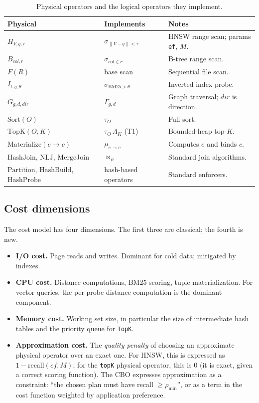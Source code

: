 \documentclass[sigconf,nonacm,review]{acmart}
\theoremstyle{plain}
\theoremstyle{definition}
\theoremstyle{remark}
\begin{document}
\begin{table}[t]
  \centering
  \scriptsize
  \begin{tabular}{@{}p{2.0cm}p{2.9cm}p{2.9cm}@{}}
    \toprule
    Physical & Implements & Notes \\
    \midrule
    $H_{V,q,\tau}$ & $\sigma_{\lVert V-q\rVert<\tau}$ & HNSW range scan; params \texttt{ef}, $M$. \\
    $B_{col,r}$ & $\sigma_{col \in r}$ & B-tree range scan. \\
    $F(R)$ & base scan & Sequential file scan. \\
    $I_{t,q,\theta}$ & $\sigma_{\mathrm{BM25}>\theta}$ & Inverted index probe. \\
    $G_{g,d,\mathit{dir}}$ & $\Gamma_{g,d}$ & Graph traversal; $\mathit{dir}$ is direction. \\
    $\mathrm{Sort}(O)$ & $\tau_O$ & Full sort. \\
    $\mathrm{TopK}(O,K)$ & $\tau_O\, \Lambda_K$ (T1) & Bounded-heap top-$K$. \\
    $\mathrm{Materialize}(e\to c)$ & $\mu_{e\to c}$ & Computes $e$ and binds $c$. \\
    $\mathrm{HashJoin}$, $\mathrm{NLJ}$, $\mathrm{MergeJoin}$ & $\bowtie_\psi$ & Standard join algorithms. \\
    $\mathrm{Partition}$, $\mathrm{HashBuild}$, $\mathrm{HashProbe}$ & hash-based operators & Standard enforcers. \\
    \bottomrule
  \end{tabular}
  \caption{Physical operators and the logical operators they implement.}
  \label{tab:phys}
\end{table}

\subsection{Cost dimensions}

The cost model has four dimensions. The first three are classical;
the fourth is new.

\begin{itemize}[leftmargin=*]
  \item \textbf{I/O cost.} Page reads and writes. Dominant for cold
    data; mitigated by indexes.
  \item \textbf{CPU cost.} Distance computations, BM25 scoring, tuple
    materialization. For vector queries, the per-probe distance
    computation is the dominant component.
  \item \textbf{Memory cost.} Working set size, in particular the
    size of intermediate hash tables and the priority queue for
    \texttt{TopK}.
  \item \textbf{Approximation cost.} The \emph{quality penalty} of
    choosing an approximate physical operator over an exact one. For
    HNSW, this is expressed as $1 - \mathrm{recall}(\mathit{ef}, M)$;
    for the \texttt{topK} physical operator, this is $0$ (it is
    exact, given a correct scoring function). The CBO expresses
    approximation as a constraint: ``the chosen plan must have
    recall $\geq \rho_{\min}$'', or as a term in the cost function
    weighted by application preference.
\end{itemize}
\end{document}
